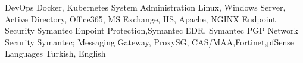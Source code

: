 \begin{cvskills}
  \cvskill
    {DevOps} %
    {Docker, Kubernetes} %
  \cvskill
    {System Administration} %
    {Linux, Windows Server, Active Directory, Office365, MS Exchange, IIS, Apache, NGINX} %
  \cvskill
    {Endpoint Security} %
    {Symantec Enpoint Protection,Symantec EDR, Symantec PGP} %
  \cvskill
    {Network Security} %
    {Symantec; Messaging Gateway, ProxySG, CAS/MAA,Fortinet,pfSense} %
  \cvskill
    {Languages} %
    {Turkish, English} %
\end{cvskills}